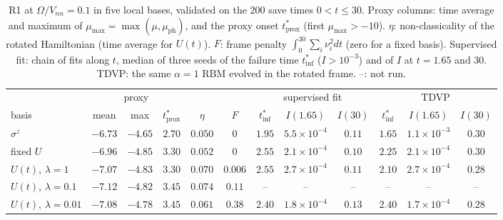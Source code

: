 \documentclass[11pt,a4paper]{article}
\newcommand{\inff}{I}
\newcommand{\tinf}{t^*_{\mathrm{inf}}}
\newcommand{\tprox}{t^*_{\mathrm{prox}}}
\begin{document}
\begin{table}[t]
  \centering
  \caption{R1 at $\Omega/V_{nn}=0.1$ in five local bases, validated on the 200 save times $0<t\le30$. Proxy columns:
    time average and maximum of $\mu_{\max}=\max(\mu,\mu_{\mathrm{ph}})$, and the proxy onset $\tprox$ (first
    $\mu_{\max}>-10$). $\eta$: non-classicality of the rotated Hamiltonian (time average for $U(t)$). $F$: frame penalty
    $\int_0^{30}\sum_i\nu_i^2dt$ (zero for a fixed basis). Supervised fit: chain of fits along $t$, median of three
    seeds of the failure time $\tinf$ ($\inff>10^{-3}$) and of $\inff$ at $t=1.65$ and $30$. TDVP: the same $\alpha=1$
    RBM evolved in the rotated frame. --: not run.}
  \label{tab:basis}
  \footnotesize
  \setlength{\tabcolsep}{4pt}
  \begin{tabular}{lccccccccccc}
    \toprule
    & \multicolumn{3}{c}{proxy} & & & \multicolumn{3}{c}{supervised fit} & \multicolumn{3}{c}{TDVP}\\
    \cmidrule(lr){2-4}\cmidrule(lr){7-9}\cmidrule(lr){10-12}
    basis & mean & max & $\tprox$ & $\eta$ & $F$ & $\tinf$ & $\inff(1.65)$ & $\inff(30)$ & $\tinf$ & $\inff(1.65)$ & $\inff(30)$\\
    \midrule
    $\sigma^z$ & $-6.73$ & $-4.65$ & $2.70$ & $0.050$ & $0$ & $1.95$ & $5.5\times10^{-4}$ & $0.11$ & $1.65$ & $1.1\times10^{-3}$ & $0.30$\\
    fixed $U$ & $-6.96$ & $-4.85$ & $3.30$ & $0.052$ & $0$ & $2.55$ & $2.1\times10^{-4}$ & $0.10$ & $2.25$ & $2.1\times10^{-4}$ & $0.30$\\
    $U(t)$, $\lambda=1$ & $-7.07$ & $-4.83$ & $3.30$ & $0.070$ & $0.006$ & $2.55$ & $2.7\times10^{-4}$ & $0.11$ & $2.10$ & $2.7\times10^{-4}$ & $0.28$\\
    $U(t)$, $\lambda=0.1$ & $-7.12$ & $-4.82$ & $3.45$ & $0.074$ & $0.11$ & -- & -- & -- & -- & -- & --\\
    $U(t)$, $\lambda=0.01$ & $-7.08$ & $-4.78$ & $3.45$ & $0.061$ & $0.38$ & $2.40$ & $1.8\times10^{-4}$ & $0.13$ & $2.40$ & $1.7\times10^{-4}$ & $0.28$\\
    \bottomrule
  \end{tabular}
\end{table}
\end{document}
